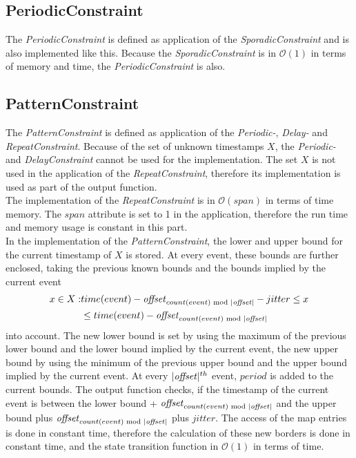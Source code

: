 \subsection{PeriodicConstraint}
	The \emph{PeriodicConstraint} is defined as application of the \emph{SporadicConstraint} and is also implemented like this. Because the \emph{SporadicConstraint} is in $\mathcal{O}(1)$ in terms of memory and time, the \emph{PeriodicConstraint} is also.
	
\subsection{PatternConstraint}
	The \emph{PatternConstraint} is defined as application of the \emph{Periodic-}, \emph{Delay-} and \emph{RepeatConstraint}. Because of the set of unknown timestamps $X$, the \emph{Periodic-} and \emph{DelayConstraint} cannot be used for the implementation. The set $X$ is not used in the application of the \emph{RepeatConstraint}, therefore its implementation is used as part of the output function.\\
	The implementation of the \emph{RepeatConstraint} is in $\mathcal{O}(span)$ in terms of time memory. The $span$ attribute is set to 1 in the application, therefore the run time and memory usage is constant in this part.\\
	In the implementation of the \emph{PatternConstraint}, the lower and upper bound for the current timestamp of $X$ is stored. At every event, these bounds are further enclosed, taking the previous known bounds and the bounds implied by the current event
	\begin{align}
		x\in X: &time(event)-\text{\emph{offset}}_{count(event)\text{ mod }|\text{\emph{offset}}|}-jitter \leq x\\
			     &\leq  time(event)-\text{\emph{offset}}_{count(event)\text{ mod }|\text{\emph{offset}}|}
	\end{align}
	into account. The new lower bound is set by using the maximum of the previous lower bound and the lower bound implied by the current event, the new upper bound by using the minimum of the previous upper bound and the upper bound implied by the current event. At every $|\text{\emph{offset}}|^{th}$ event, $period$ is added to the current bounds. The output function checks, if the timestamp of the current event is between the lower bound + $\text{\emph{offset}}_{count(event)\text{ mod }|\text{\emph{offset}}|}$ and the upper bound plus $\text{\emph{offset}}_{count(event)\text{ mod }|\text{\emph{offset}}|}$ plus $jitter$. The access of the map entries is done in constant time, therefore the calculation of these new borders is done in constant time, and the state transition function in $\mathcal{O}(1)$ in terms of time.\\
